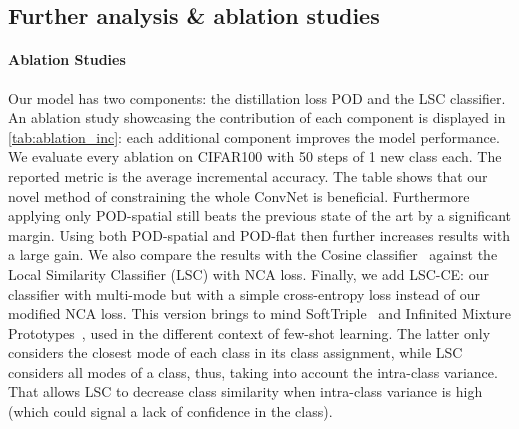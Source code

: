 


\subsection{Further analysis \& ablation studies}
\label{sec:ablation}

\paragraph{Ablation Studies}
Our model has two components: the distillation loss POD and the LSC classifier. An ablation study
showcasing the contribution of each component is displayed in \autoref{tab:ablation_inc}: each
additional component improves the model performance. We evaluate every ablation on CIFAR100 with 50
steps of 1 new class each. The reported metric is the average incremental accuracy. The table shows
that our novel method of constraining the whole ConvNet is beneficial. Furthermore applying only
POD-spatial still beats the previous state of the art by a significant margin. Using both
POD-spatial and POD-flat then further increases results with a large gain. We also compare the
results with the Cosine classifier~\citep{luo2018cosine_classifier,hou2019ucir} against the Local
Similarity Classifier (LSC) with NCA loss. Finally, we add LSC-CE: our classifier with multi-mode
but with a simple cross-entropy loss instead of our modified NCA loss. This version brings to mind
SoftTriple~\citep{qian2019softtriple} and Infinited Mixture
Prototypes~\citep{allen2019infinitemixtureproto}, used in the different context of few-shot
learning.
The latter only considers the closest mode of each class in its class assignment, while LSC
considers all modes of a class, thus, taking into account the intra-class variance. That allows LSC
to decrease class similarity when intra-class variance is high (which could signal a lack of
confidence in the class).

\label{sec:ablation_pooling}
